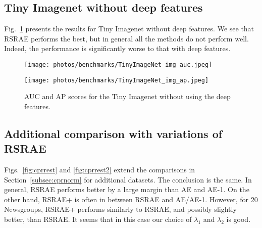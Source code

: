 \documentclass{article} \usepackage{iclr2020_conference,times}
\def\Secref#1{Section~\ref{#1}}
\begin{document}
\subsection{Tiny Imagenet without deep features}
\label{subsec:tinyimagenetwithoutdeep}

Fig.~\ref{fig:tinyimagenet} presents the results for Tiny Imagenet without deep features. We see that RSRAE performs the best, but in general all the methods do not perform well. Indeed, the performance is significantly worse to that with deep features.

\begin{figure}[ht]
\centering
\begin{minipage}[t]{0.48\textwidth}
\centering
\texttt{[image: photos/benchmarks/TinyImageNet\_img\_auc.jpeg]}
\end{minipage}
\begin{minipage}[t]{0.48\textwidth}
\centering
\texttt{[image: photos/benchmarks/TinyImageNet\_img\_ap.jpeg]}
\end{minipage}
\caption{AUC and AP scores for the Tiny Imagenet without using the deep features.}
\label{fig:tinyimagenet}
\end{figure}


\subsection{Additional comparison with variations of RSRAE}
\label{subsec:cprnormnotshown}

Figs.~\ref{fig:cprrest} and \ref{fig:cprrest2}  extend the comparisons in \Secref{subsec:cprnorm} for additional datasets. The conclusion is the same. In general, RSRAE performs better by a large margin than AE and AE-1. On the other hand, RSRAE+ is often in between RSRAE and AE/AE-1. However, for 20 Newsgroups, RSRAE+ performs similarly to RSRAE, and possibly slightly better, than RSRAE. It seems that in this case our choice of $\lambda_1$ and $\lambda_2$ is good.
\end{document}
